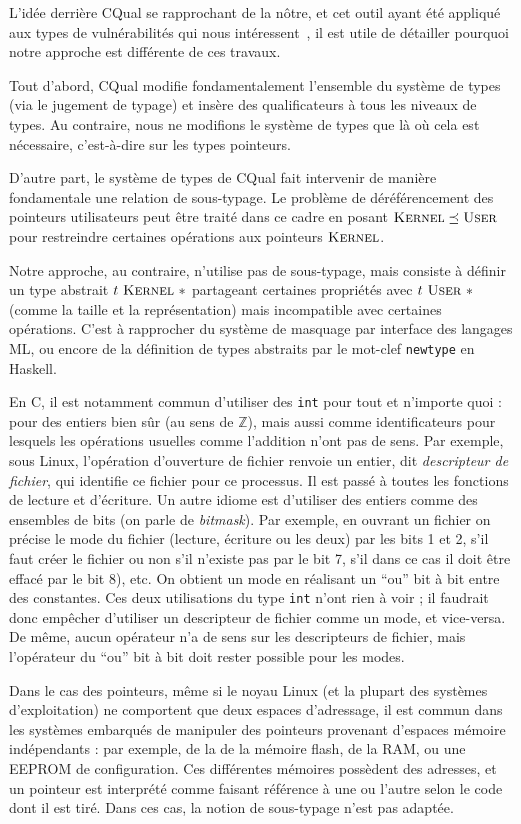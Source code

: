 L'idée derrière CQual se rapprochant de la nôtre, et cet outil ayant été
appliqué aux types de vulnérabilités qui nous intéressent~\cite{cquk-usenix04},
il est utile de détailler pourquoi notre approche est différente de ces travaux.

Tout d'abord, CQual modifie fondamentalement l'ensemble du système de types (via
le jugement de typage) et insère des qualificateurs à tous les niveaux de types.
Au contraire, nous ne modifions le système de types que là où cela est
nécessaire, c'est-à-dire sur les types pointeurs.

D'autre part, le système de types de CQual fait intervenir de manière
fondamentale une relation de sous-typage. Le problème de déréférencement des
pointeurs utilisateurs peut être traité dans ce cadre en posant $\textsc{Kernel}
\preceq \textsc{User}$ pour restreindre certaines opérations aux pointeurs $\textsc{Kernel}$.

Notre approche, au contraire, n'utilise pas de sous-typage, mais consiste à
définir un type abstrait $t~\textsc{Kernel}~*$ partageant certaines propriétés avec
$t~\textsc{User}~*$ (comme la taille et la représentation) mais incompatible avec
certaines opérations. C'est à rapprocher du système de masquage par interface
des langages ML, ou encore de la définition de types abstraits par le mot-clef
\texttt{newtype} en Haskell.

En C, il est notamment commun d'utiliser des \texttt{int} pour tout et n'importe
quoi : pour des entiers bien sûr (au sens de $ℤ$), mais aussi comme
identificateurs pour lesquels les opérations usuelles comme l'addition n'ont pas
de sens. Par exemple, sous Linux, l'opération d'ouverture de fichier renvoie un
entier, dit \emph{descripteur de fichier}, qui identifie ce fichier pour ce
processus. Il est passé à toutes les fonctions de lecture et d'écriture. Un
autre idiome est d'utiliser des entiers comme des ensembles de bits (on parle de
\emph{bitmask}). Par exemple, en ouvrant un fichier on précise le mode du
fichier (lecture, écriture ou les deux) par les bits 1 et 2, s'il faut créer le
fichier ou non s'il n'existe pas par le bit 7, s'il dans ce cas il doit être
effacé par le bit 8), etc. On obtient un mode en réalisant un ``ou'' bit à bit
entre des constantes. Ces deux utilisations du type \texttt{int} n'ont rien à
voir ; il faudrait donc empêcher d'utiliser un descripteur de fichier comme un
mode, et vice-versa. De même, aucun opérateur n'a de sens sur les descripteurs
de fichier, mais l'opérateur \texttt{\textbar{}} du ``ou'' bit à bit doit rester
possible pour les modes.

Dans le cas des pointeurs, même si le noyau Linux (et la plupart des systèmes
d'exploitation) ne comportent que deux espaces d'adressage, il est commun dans
les systèmes embarqués de manipuler des pointeurs provenant d'espaces mémoire
indépendants : par exemple, de la de la mémoire flash, de la RAM, ou une EEPROM
de configuration. Ces différentes mémoires possèdent des adresses, et un
pointeur est interprété comme faisant référence à une ou l'autre selon le code
dont il est tiré. Dans ces cas, la notion de sous-typage n'est pas adaptée.
